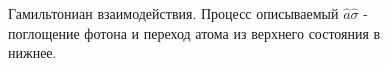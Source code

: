 \begin{figure}
\centering



\caption{Гамильтониан взаимодействия. Процесс описываемый $\hat{a}\hat{\sigma}$ - поглощение
  фотона и переход атома из верхнего состояния в нижнее.}
\label{figPart1Ch2_2_1}
\end{figure}
